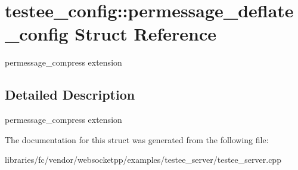 \hypertarget{structtestee__config_1_1permessage__deflate__config}{}\section{testee\+\_\+config\+:\+:permessage\+\_\+deflate\+\_\+config Struct Reference}
\label{structtestee__config_1_1permessage__deflate__config}


permessage\+\_\+compress extension  




\subsection{Detailed Description}
permessage\+\_\+compress extension 

The documentation for this struct was generated from the following file\+:\begin{DoxyCompactItemize}
\item 
libraries/fc/vendor/websocketpp/examples/testee\+\_\+server/testee\+\_\+server.\+cpp\end{DoxyCompactItemize}
